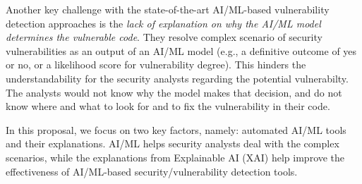 
Another key challenge with the state-of-the-art AI/ML-based
vulnerability detection approaches is the {\em lack of explanation on
why the AI/ML model determines the vulnerable code}. They resolve
complex scenario of security vulnerabilities as an output of an AI/ML
model (e.g., a definitive outcome of yes or no, or a likelihood score
for vulnerability degree). This hinders the understandability for the
security analysts regarding the potential vulnerabilty. The analysts
would not know why the model makes that decision, and do not know
where and what to look for and to fix the vulnerability in their code.

In this proposal, we focus on two key factors, namely: automated AI/ML
tools and their explanations. AI/ML helps security analysts deal with
the complex scenarios, while the explanations from Explainable AI
(XAI) help improve the effectiveness of AI/ML-based security/vulnerability
detection tools.





